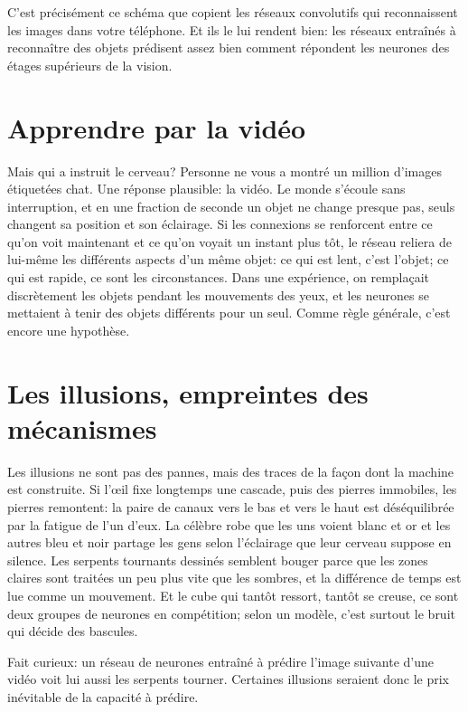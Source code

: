 C'est précisément ce schéma que copient les réseaux convolutifs qui reconnaissent les images dans votre téléphone. Et ils le lui rendent bien: les réseaux entraînés à reconnaître des objets prédisent assez bien comment répondent les neurones des étages supérieurs de la vision.

\section*{Apprendre par la vidéo}

Mais qui a instruit le cerveau? Personne ne vous a montré un million d'images étiquetées \og chat\fg{}. Une réponse plausible: la vidéo. Le monde s'écoule sans interruption, et en une fraction de seconde un objet ne change presque pas, seuls changent sa position et son éclairage. Si les connexions se renforcent entre ce qu'on voit maintenant et ce qu'on voyait un instant plus tôt, le réseau reliera de lui-même les différents aspects d'un même objet: ce qui est lent, c'est l'objet; ce qui est rapide, ce sont les circonstances. Dans une expérience, on remplaçait discrètement les objets pendant les mouvements des yeux, et les neurones se mettaient à tenir des objets différents pour un seul. Comme règle générale, c'est encore une hypothèse.

\section*{Les illusions, empreintes des mécanismes}

Les illusions ne sont pas des pannes, mais des traces de la façon dont la machine est construite. Si l'œil fixe longtemps une cascade, puis des pierres immobiles, les pierres \og remontent\fg{}: la paire de canaux \og vers le bas\fg{} et \og vers le haut\fg{} est déséquilibrée par la fatigue de l'un d'eux. La célèbre robe que les uns voient blanc et or et les autres bleu et noir partage les gens selon l'éclairage que leur cerveau suppose en silence. Les \og serpents tournants\fg{} dessinés semblent bouger parce que les zones claires sont traitées un peu plus vite que les sombres, et la différence de temps est lue comme un mouvement. Et le cube qui tantôt ressort, tantôt se creuse, ce sont deux groupes de neurones en compétition; selon un modèle, c'est surtout le bruit qui décide des bascules.

Fait curieux: un réseau de neurones entraîné à prédire l'image suivante d'une vidéo \og voit\fg{} lui aussi les serpents tourner. Certaines illusions seraient donc le prix inévitable de la capacité à prédire.

